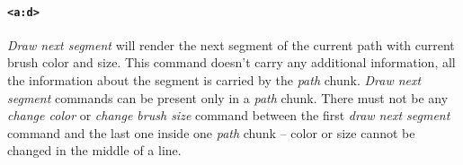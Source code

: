 \paragraph{\texttt{\textless a:d\textgreater}}
\textit{Draw next segment} will render the next segment of the current path with current brush color and size. This command doesn't carry any additional information, all the information about the segment is carried by the \textit{path} chunk. \textit{Draw next segment} commands can be present only in a \textit{path} chunk. There must not be any \textit{change color} or \textit{change brush size} command between the first \textit{draw next segment} command and the last one inside one \textit{path} chunk -- color or size cannot be changed in the middle of a line.